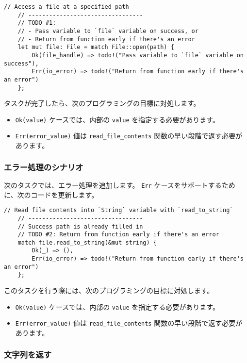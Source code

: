 \begin{lstlisting}[numbers=none]
    // Access a file at a specified path
    // ---------------------------------
    // TODO #1:
    // - Pass variable to `file` variable on success, or
    // - Return from function early if there's an error
    let mut file: File = match File::open(path) {
        Ok(file_handle) => todo!("Pass variable to `file` variable on success"),
        Err(io_error) => todo!("Return from function early if there's an error")
    };
\end{lstlisting}

タスクが完了したら、次のプログラミングの目標に対処します。

\begin{itemize}
\item \texttt{Ok(value)} ケースでは、内部の \texttt{value} を指定する必要があります。
\item \texttt{Err(error\_value)} 値は \texttt{read\_file\_contents} 関数の早い段階で返す必要があります。
\end{itemize}

\subsubsection{エラー処理のシナリオ}

次のタスクでは、エラー処理を追加します。 \texttt{Err} ケースをサポートするために、次のコードを更新します。

\begin{lstlisting}[numbers=none]
    // Read file contents into `String` variable with `read_to_string`
    // ---------------------------------
    // Success path is already filled in
    // TODO #2: Return from function early if there's an error
    match file.read_to_string(&mut string) {
        Ok(_) => (),
        Err(io_error) => todo!("Return from function early if there's an error")
    };
\end{lstlisting}

このタスクを行う際には、次のプログラミングの目標に対処します。

\begin{itemize}
\item \texttt{Ok(value)} ケースでは、内部の \texttt{value} を指定する必要があります。
\item \texttt{Err(error\_value)} 値は \texttt{read\_file\_contents} 関数の早い段階で返す必要があります。
\end{itemize}

\subsubsection{文字列を返す}


